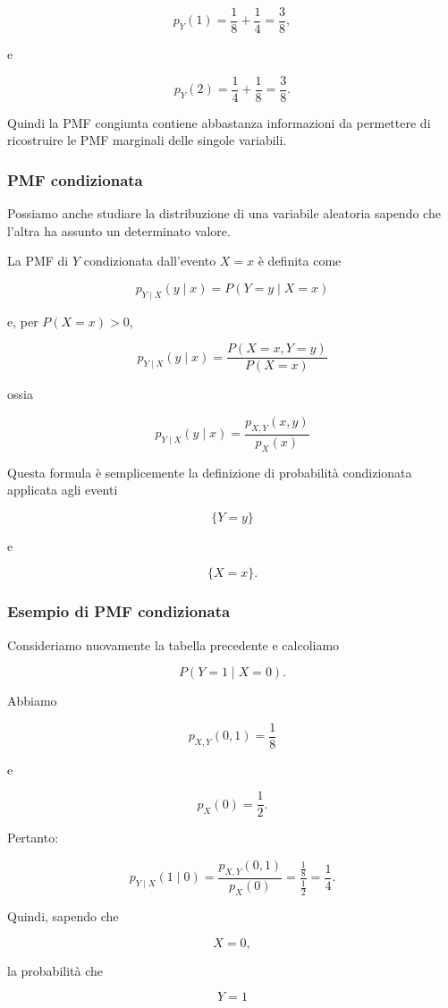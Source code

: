 $$
p_Y(1)
=
\frac18+\frac14
=
\frac38,
$$

e

$$
p_Y(2)
=
\frac14+\frac18
=
\frac38.
$$

Quindi la PMF congiunta contiene abbastanza informazioni da permettere di ricostruire le PMF marginali delle singole variabili.

\subsubsection{PMF condizionata}

Possiamo anche studiare la distribuzione di una variabile aleatoria sapendo che l'altra ha assunto un determinato valore.

La PMF di $Y$ condizionata dall'evento ${X=x}$ è definita come

$$
\boxed{
p_{Y\mid X}(y\mid x)
=
P(Y=y\mid X=x)
}
$$

e, per $P(X=x)>0$,

$$
\boxed{
p_{Y\mid X}(y\mid x)
=
\frac{P(X=x,Y=y)}
{P(X=x)}
}
$$

ossia

$$
\boxed{
p_{Y\mid X}(y\mid x)
=
\frac{p_{X,Y}(x,y)}
{p_X(x)}
}
$$

Questa formula è semplicemente la definizione di probabilità condizionata applicata agli eventi

$$
\{Y=y\}
$$

e

$$
\{X=x\}.
$$

\subsubsection{Esempio di PMF condizionata}

Consideriamo nuovamente la tabella precedente e calcoliamo

$$
P(Y=1\mid X=0).
$$

Abbiamo

$$
p_{X,Y}(0,1)=\frac18
$$

e

$$
p_X(0)=\frac12.
$$

Pertanto:

$$
p_{Y\mid X}(1\mid0)
=
\frac{p_{X,Y}(0,1)}
{p_X(0)}
=
\frac{\frac18}{\frac12}
=
\frac14.
$$

Quindi, sapendo che

$$
X=0,
$$

la probabilità che

$$
Y=1
$$

